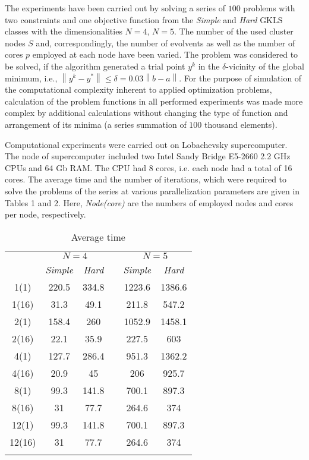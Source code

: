 \documentclass[smallextended]{svjour3}       %
\begin{document}
The experiments have been carried out by solving a series of $100$ problems with two constraints and one objective function from the \textit{Simple} and \textit{Hard} GKLS classes with the dimensionalities $N=4$, $N=5$. The number of the used cluster nodes $S$ and, correspondingly, the number of evolvents as well as the number of cores $p$ employed at each node have been varied. The problem was considered to be solved, if the algorithm generated a trial point $y^k$ in the $\delta$-vicinity of the global minimum, i.e., $\left\|y^k-y^*\right\|\leq \delta = 0.03\left\|b-a\right\|$. For the purpose of simulation of the computational complexity inherent to applied optimization problems, calculation of the problem functions in all performed experiments was made more complex by additional calculations without changing the type of function and arrangement of its minima (a series summation of $100$ thousand elements).

Computational experiments were carried out on Lobachevsky supercomputer. The node of supercomputer included two Intel Sandy Bridge E5-2660 2.2 GHz CPUs and 64 Gb RAM. The CPU had 8 cores, i.e. each node had a total of 16 cores. The average time and the number of iterations, which were required to solve the problems of the series at various parallelization parameters are given in Tables 1 and 2. Here, \textit{Node(core)} are the numbers of employed  nodes and cores per node, respectively.

\begin{table}
	\caption{Average time}
	\label{tab:1}
	\center
	\begin{tabular}{cccccc}
		\hline\noalign{\smallskip}
		\multirow{2}{*}{\textit{Node(core)}} & \multicolumn{2}{c}{ $N=4$ } & & \multicolumn{2}{c}{$N=5$} \\
		\noalign{\smallskip} \cline{2-3} \cline{5-6} \noalign{\smallskip}
		 & \textit{Simple} & \textit{Hard} & & \textit{Simple} & \textit{Hard}  \\
		\noalign{\smallskip} \hline \noalign{\smallskip}
1(1)	&	220.5	&	334.8	&	&	1223.6	&	1386.6	\\
1(16)	&	31.3	&	49.1	&	&	211.8	&	547.2	\\
2(1)	&	158.4	&	260	&	&	1052.9	&	1458.1	\\
2(16)	&	22.1	&	35.9	&	&	227.5	&	603	\\
4(1)	&	127.7	&	286.4	&	&	951.3	&	1362.2	\\
4(16)	&	20.9	&	45	&	&	206	&	925.7	\\
8(1)	&	99.3	&	141.8	&	&	700.1	&	897.3	\\
8(16)	&	31	&	77.7	&	&	264.6	&	374	\\
12(1)	&	99.3	&	141.8	&	&	700.1	&	897.3	\\
12(16)	&	31	&	77.7	&	&	264.6	&	374	\\
		\noalign{\smallskip}\hline
	\end{tabular}
\end{table}
\end{document}
